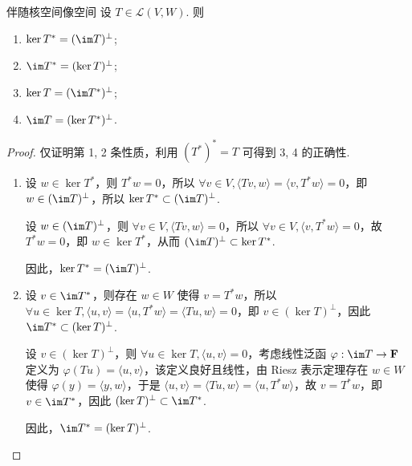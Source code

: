 \begin{theorem}{}{伴随核空间像空间}
设 $ T \in \mathcal{L}(V, W) $. 则

\begin{enumerate}
    \item $ \ker T^* = (\im T)^{\perp} $;

    \item $ \im T^* = (\ker T)^{\perp} $;

    \item $ \ker T = (\im T^*)^{\perp} $;

    \item $ \im T = (\ker T^*)^{\perp} $.
\end{enumerate}
\end{theorem}

\begin{proof}
    仅证明第 1, 2 条性质，利用 $(T^*)^*=T$ 可得到 3, 4 的正确性.
    \begin{enumerate}
        \item 设 $ w \in \ker T^* $，则 $ T^*w = 0 $，所以 $ \forall v \in V, \langle Tv, w \rangle = \langle v, T^*w \rangle = 0 $，即 $ w \in (\im T)^{\perp} $，所以 $ \ker T^* \subset (\im T)^{\perp} $.

        设 $ w \in (\im T)^{\perp} $，则 $ \forall v \in V, \langle Tv, w \rangle = 0 $，所以 $ \forall v \in V, \langle v, T^*w \rangle = 0 $，故 $ T^*w = 0 $，即 $ w \in \ker T^* $，从而 $ (\im T)^{\perp} \subset \ker T^* $.

        因此，$ \ker T^* = (\im T)^{\perp} $.

        \item 设 $ v \in \im T^* $，则存在 $ w \in W $ 使得 $ v = T^*w $，所以 $ \forall u \in \ker T, \langle u, v \rangle = \langle u, T^*w \rangle = \langle Tu, w \rangle = 0 $，即 $ v \in (\ker T)^{\perp} $，因此 $ \im T^* \subset (\ker T)^{\perp} $.

        设 $ v \in (\ker T)^{\perp} $，则 $ \forall u \in \ker T, \langle u, v \rangle = 0 $，考虑线性泛函 $ \varphi: \im T \to \mathbf{F} $ 定义为 $ \varphi(Tu) = \langle u, v \rangle $，该定义良好且线性，由 Riesz 表示定理存在 $ w \in W $ 使得 $ \varphi(y) = \langle y, w \rangle $，于是 $ \langle u, v \rangle = \langle Tu, w \rangle = \langle u, T^*w \rangle $，故 $ v = T^*w $，即 $ v \in \im T^* $，因此 $ (\ker T)^{\perp} \subset \im T^* $.

        因此，$ \im T^* = (\ker T)^{\perp} $.
    \end{enumerate}
\end{proof}


